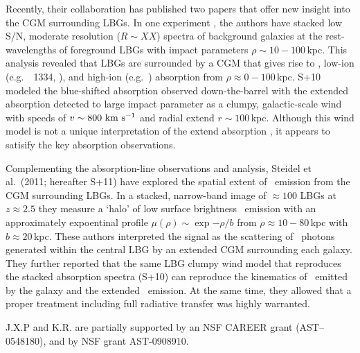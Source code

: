 \documentclass[12pt,preprint]{aastex}
\begin{document}
Recently, their
collaboration has published two papers that offer new insight into the
CGM surrounding LBGs.   In one experiment \citep[][hereafter
S+10]{steidel+10}, the authors have stacked low S/N, moderate
resolution ($R \sim XX$) spectra of background galaxies at the
rest-wavelengths of foreground LBGs with impact parameters $\rho \sim
10-100$\,kpc.  This analysis revealed that LBGs are surrounded by a
CGM that gives rise to , low-ion (e.g.\ ~1334,
), and high-ion (e.g.\ ) absorption from $\rho
\approx 0-100$\,kpc.  S+10 modeled the blue-shifted absorption
observed down-the-barrel with the extended absorption detected to
large impact parameter as a clumpy, galactic-scale wind with speeds of
$v \sim 800 \, \, {\rm km~s^{-1}}$ and radial extend $r \sim 100$\,kpc.  Although
this wind model is not a unique interpretation of the extend
 absorption \citep{fpk+11}, it appears to satisify the key
absorption observations.

Complementing the absorption-line observations and analysis,
Steidel et al.\ (2011; hereafter S+11) have explored the spatial
extent of \lya\ emission from the CGM surrounding LBGs.  In a stacked,
narrow-band image of $\approx 100$ LBGs at $z \approx 2.5$ they
measure a `halo' of low surface brightness \lya\ emission with an
approximately expoentinal profile $\mu(\rho) \sim \exp{-\rho/b}$ from
$\rho \approx 10-80$\,kpc with $b \approx 20$\,kpc.  These authors
interpreted the signal as the scattering of \lya\ photons generated
within the central LBG by an extended CGM surrounding each galaxy.
They further reported that the same LBG clumpy wind model that
reproduces the stacked absorption spectra (S+10) can reproduce the
kinematics of \lya\ emitted by the galaxy and the extended \lya\
emission.  At the same time, they allowed that a proper treatment
including full radiative transfer was highly warranted.





\acknowledgments

J.X.P and K.R. are partially supported
by an NSF CAREER grant (AST--0548180), and 
by NSF grant AST-0908910.

\clearpage

%
%



\clearpage
\end{document}
